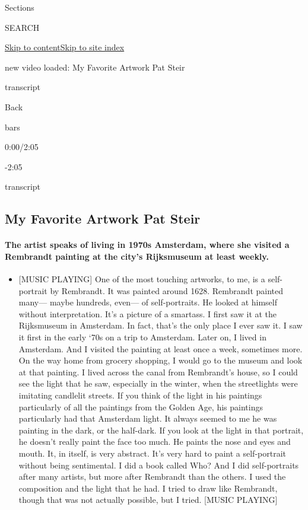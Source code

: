 Sections

SEARCH

\protect\hyperlink{site-content}{Skip to
content}\protect\hyperlink{site-index}{Skip to site index}

new video loaded: My Favorite Artwork \textbar{} Pat Steir

transcript

Back

bars

0:00/2:05

-2:05

transcript

\hypertarget{my-favorite-artwork--pat-steir}{%
\subsection{My Favorite Artwork \textbar{} Pat
Steir}\label{my-favorite-artwork--pat-steir}}

\hypertarget{the-artist-speaks-of-living-in-1970s-amsterdam-where-she-visited-a-rembrandt-painting-at-the-citys-rijksmuseum-at-least-weekly}{%
\paragraph{The artist speaks of living in 1970s Amsterdam, where she
visited a Rembrandt painting at the city's Rijksmuseum at least
weekly.}\label{the-artist-speaks-of-living-in-1970s-amsterdam-where-she-visited-a-rembrandt-painting-at-the-citys-rijksmuseum-at-least-weekly}}

\begin{itemize}
\tightlist
\item
  {[}MUSIC PLAYING{]} One of the most touching artworks, to me, is a
  self-portrait by Rembrandt. It was painted around 1628. Rembrandt
  painted many--- maybe hundreds, even--- of self-portraits. He looked
  at himself without interpretation. It's a picture of a smartass. I
  first saw it at the Rijksmuseum in Amsterdam. In fact, that's the only
  place I ever saw it. I saw it first in the early `70s on a trip to
  Amsterdam. Later on, I lived in Amsterdam. And I visited the painting
  at least once a week, sometimes more. On the way home from grocery
  shopping, I would go to the museum and look at that painting. I lived
  across the canal from Rembrandt's house, so I could see the light that
  he saw, especially in the winter, when the streetlights were imitating
  candlelit streets. If you think of the light in his paintings
  particularly of all the paintings from the Golden Age, his paintings
  particularly had that Amsterdam light. It always seemed to me he was
  painting in the dark, or the half-dark. If you look at the light in
  that portrait, he doesn't really paint the face too much. He paints
  the nose and eyes and mouth. It, in itself, is very abstract. It's
  very hard to paint a self-portrait without being sentimental. I did a
  book called Who? And I did self-portraits after many artists, but more
  after Rembrandt than the others. I used the composition and the light
  that he had. I tried to draw like Rembrandt, though that was not
  actually possible, but I tried. {[}MUSIC PLAYING{]}
\end{itemize}

